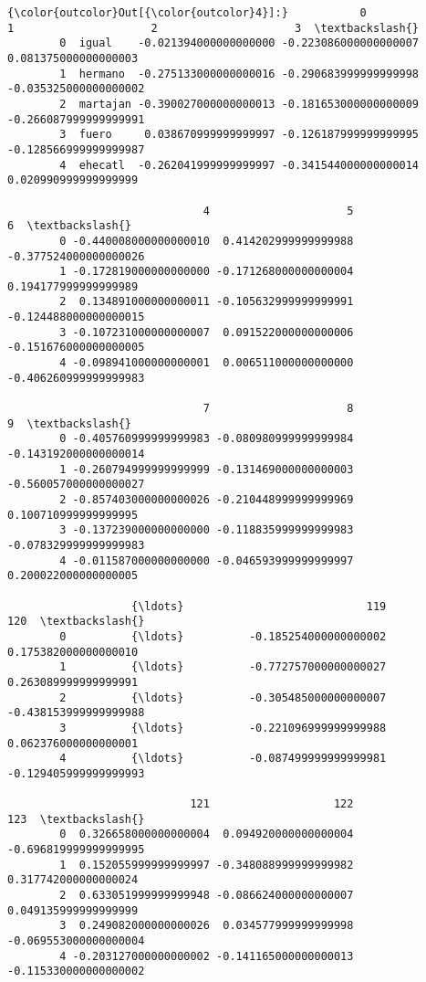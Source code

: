 \documentclass[11pt]{article}
\begin{document}
\begin{Verbatim}[commandchars=\\\{\}]
{\color{outcolor}Out[{\color{outcolor}4}]:}           0                     1                     2                     3  \textbackslash{}
        0  igual    -0.021394000000000000 -0.223086000000000007  0.081375000000000003   
        1  hermano  -0.275133000000000016 -0.290683999999999998 -0.035325000000000002   
        2  martajan -0.390027000000000013 -0.181653000000000009 -0.266087999999999991   
        3  fuero     0.038670999999999997 -0.126187999999999995 -0.128566999999999987   
        4  ehecatl  -0.262041999999999997 -0.341544000000000014  0.020990999999999999   
        
                              4                     5                     6  \textbackslash{}
        0 -0.440008000000000010  0.414202999999999988 -0.377524000000000026   
        1 -0.172819000000000000 -0.171268000000000004  0.194177999999999989   
        2  0.134891000000000011 -0.105632999999999991 -0.124488000000000015   
        3 -0.107231000000000007  0.091522000000000006 -0.151676000000000005   
        4 -0.098941000000000001  0.006511000000000000 -0.406260999999999983   
        
                              7                     8                     9  \textbackslash{}
        0 -0.405760999999999983 -0.080980999999999984 -0.143192000000000014   
        1 -0.260794999999999999 -0.131469000000000003 -0.560057000000000027   
        2 -0.857403000000000026 -0.210448999999999969  0.100710999999999995   
        3 -0.137239000000000000 -0.118835999999999983 -0.078329999999999983   
        4 -0.011587000000000000 -0.046593999999999997  0.200022000000000005   
        
                   {\ldots}                            119                   120  \textbackslash{}
        0          {\ldots}          -0.185254000000000002  0.175382000000000010   
        1          {\ldots}          -0.772757000000000027  0.263089999999999991   
        2          {\ldots}          -0.305485000000000007 -0.438153999999999988   
        3          {\ldots}          -0.221096999999999988  0.062376000000000001   
        4          {\ldots}          -0.087499999999999981 -0.129405999999999993   
        
                            121                   122                   123  \textbackslash{}
        0  0.326658000000000004  0.094920000000000004 -0.696819999999999995   
        1  0.152055999999999997 -0.348088999999999982  0.317742000000000024   
        2  0.633051999999999948 -0.086624000000000007  0.049135999999999999   
        3  0.249082000000000026  0.034577999999999998 -0.069553000000000004   
        4 -0.203127000000000002 -0.141165000000000013 -0.115330000000000002   
        

\end{Verbatim}
\end{document}
